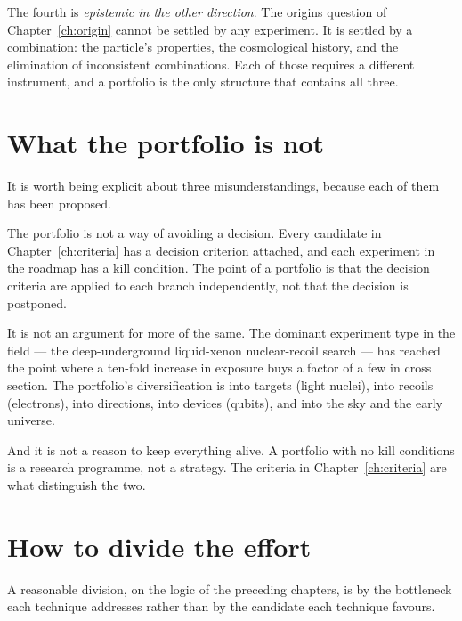 The fourth is \emph{epistemic in the other direction}. The origins question
of Chapter~\ref{ch:origin} cannot be settled by any experiment. It is
settled by a combination: the particle's properties, the cosmological
history, and the elimination of inconsistent combinations. Each of those
requires a different instrument, and a portfolio is the only structure that
contains all three.

\section{What the portfolio is not}It is worth being explicit about three
misunderstandings, because each of them has been proposed.

The portfolio is not a way of avoiding a decision. Every candidate in
Chapter~\ref{ch:criteria} has a decision criterion attached, and each
experiment in the roadmap has a kill condition. The point of a portfolio is
that the decision criteria are applied to each branch independently, not that
the decision is postponed.

It is not an argument for more of the same. The dominant experiment type in
the field --- the deep-underground liquid-xenon nuclear-recoil search ---
has reached the point where a ten-fold increase in exposure buys a factor of
a few in cross section. The portfolio's diversification is into targets
(light nuclei), into recoils (electrons), into directions, into devices
(qubits), and into the sky and the early universe.

And it is not a reason to keep everything alive. A portfolio with no kill
conditions is a research programme, not a strategy. The criteria in
Chapter~\ref{ch:criteria} are what distinguish the two.

\section{How to divide the effort}A reasonable division, on the logic of the
preceding chapters, is by the bottleneck each technique addresses rather than
by the candidate each technique favours.

